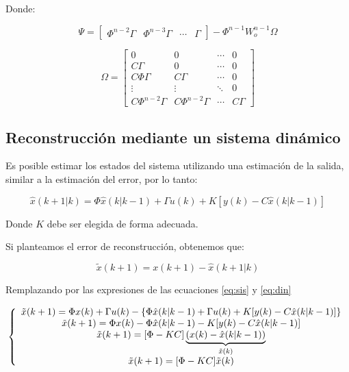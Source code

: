 Donde: 

\begin{equation}
    \Psi = \begin{bmatrix}
        \Phi^{n-2} \Gamma & 
        \Phi^{n-3} \Gamma & 
        \cdots & 
        \Gamma
    \end{bmatrix} - 
    \Phi^{n-1}W^{n-1}_o\Omega
\end{equation}

\begin{equation}
    \Omega = \begin{bmatrix}
        0 & 0 & \cdots & 0 \\ 
        C\Gamma & 0 & \cdots & 0 \\ 
        C\Phi\Gamma & C\Gamma & \cdots & 0 \\ 
        \vdots & \vdots & \ddots & 0 \\ 
        C\Phi^{n-2}\Gamma & C\Phi^{n-2}\Gamma & \cdots & C\Gamma 
    \end{bmatrix}
\end{equation}

\subsection{Reconstrucción mediante un sistema dinámico}

Es posible estimar los estados del sistema utilizando una estimación de la salida, 
similar a la estimación del error, por lo tanto: 

\begin{equation}
    \label{eq:din}
    \hat{x}(k+1|k) = \Phi \hat{x}(k|k-1) + \Gamma u(k) + K[y(k) - C \hat{x}(k|k-1)]
\end{equation}

Donde $K$ debe ser elegida de forma adecuada. 

Si planteamos el error de reconstrucción, obtenemos que: 

\begin{equation}
    \tilde{x}(k+1) = x(k+1) - \hat{x}(k+1|k) 
\end{equation}

Remplazando por las expresiones de las ecuaciones \ref{eq:sis} y \ref{eq:din}

\begin{equation}
    \left\{ \begin{array}{c} 
        \tilde{x}(k+1) = \Phi x(k) + \Gamma u(k) - \left\{ 
        \Phi \hat{x}(k|k-1) + \Gamma u(k) + K[y(k) - C \hat{x}(k|k-1)]
    \right \} \\ 
        \tilde{x}(k+1) = \Phi x(k) - \Phi \hat{x}(k|k-1) - K[y(k) - C \hat{x}(k|k-1)] \\ 
        \tilde{x}(k+1) = [\Phi - KC] \underbrace{(x(k) - \hat{x}(k|k-1))}_{\tilde{x}(k)} \\ 
        \tilde{x}(k+1) = [\Phi - KC] \tilde{x}(k)
     \end{array} \right.
\end{equation}

